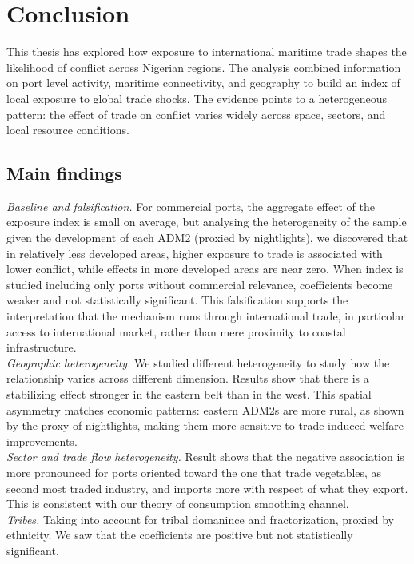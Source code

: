 
\chapter{Conclusion}
This thesis has explored how exposure to international maritime trade shapes the likelihood of conflict across Nigerian regions. The analysis combined information on port level activity, maritime connectivity, and geography to build an index of local exposure to global trade shocks. The evidence points to a heterogeneous pattern: the effect of trade on conflict varies widely across space, sectors, and local resource conditions.

\section{Main findings}
\textit{Baseline and falsification.} For commercial ports, the aggregate effect of the exposure index is small on average, but analysing the heterogeneity of the sample given the development of each ADM2 (proxied by nightlights), we discovered that in relatively less developed areas, higher exposure to trade is associated with lower conflict, while effects in more developed areas are near zero. When index is studied including only ports without commercial relevance, coefficients become weaker and not statistically significant. This falsification supports the interpretation that the mechanism runs through international trade, in particolar access to international market, rather than mere proximity to coastal infrastructure. \\

\textit{Geographic heterogeneity.} We studied different heterogeneity to study how the relationship varies across different dimension. Results show that there is a stabilizing effect stronger in the eastern belt than in the west. This spatial asymmetry matches economic patterns: eastern ADM2s are more rural, as shown by the proxy of nightlights, making them more sensitive to trade induced welfare improvements.\\

\textit{Sector and trade flow heterogeneity.} Result shows that the negative association is more pronounced for ports oriented toward the one that trade vegetables, as second most traded industry, and imports more with respect of what they export. This is consistent with our theory of consumption smoothing channel.\\

\textit{Tribes.} Taking into account for tribal domanince and fractorization, proxied by ethnicity. We saw that the coefficients are positive but not statistically significant. \\

